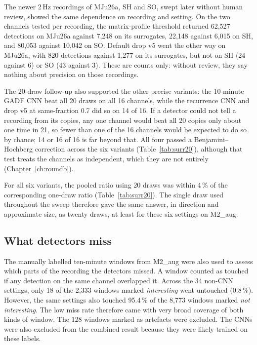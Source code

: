 The newer 2\,Hz recordings of MJu26a, SH and SO, swept later without human review, showed the same dependence on recording and setting. On the two channels tested per recording, the matrix-profile threshold returned 62,527 detections on MJu26a against 7,248 on its surrogates, 22,148 against 6,015 on SH, and 80,053 against 10,042 on SO. Default drop v5 went the other way on MJu26a, with 820 detections against 1,277 on its surrogates, but not on SH (24 against 6) or SO (43 against 3). These are counts only: without review, they say nothing about precision on those recordings.


The 20-draw follow-up also supported the other precise variants: the 10-minute GADF CNN beat all 20 draws on all 16 channels, while the recurrence CNN and drop v5 at same-fraction 0.7 did so on 14 of 16. If a detector could not tell a recording from its copies, any one channel would beat all 20 copies only about one time in 21, so fewer than one of the 16 channels would be expected to do so by chance; 14 or 16 of 16 is far beyond that. All four passed a Benjamini--Hochberg correction across the six variants (Table~\ref{tab:surr20}), although that test treats the channels as independent, which they are not entirely (Chapter~\ref{ch:roundb}).

For all six variants, the pooled ratio using 20 draws was within 4\,\% of the corresponding one-draw ratio (Table~\ref{tab:surr20}). The single draw used throughout the sweep therefore gave the same answer, in direction and approximate size, as twenty draws, at least for these six settings on M2\_aug.


\subsection{What detectors miss}
\label{sec:misses}

The manually labelled ten-minute windows from M2\_aug were also used to assess which parts of the recording the detectors missed. A window counted as touched if any detection on the same channel overlapped it. Across the 34 non-CNN settings, only 18 of the 2,333 windows marked \emph{interesting} went untouched (0.8\,\%). However, the same settings also touched 95.4\,\% of the 8,773 windows marked \emph{not interesting}. The low miss rate therefore came with very broad coverage of both kinds of window. The 128 windows marked as artefacts were excluded. The CNNs were also excluded from the combined result because they were likely trained on these labels.

